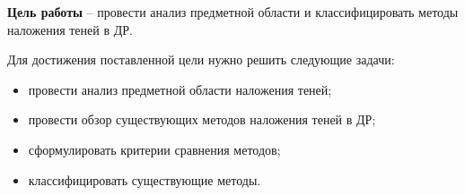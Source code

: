 \textbf{Цель работы} -- провести анализ предметной области и классифицировать методы наложения теней в ДР.

Для достижения поставленной цели нужно решить следующие задачи:

\begin{itemize}
	\item провести анализ предметной области наложения теней;
	\item провести обзор существующих методов наложения теней в ДР;
	\item сформулировать критерии сравнения методов;
	\item классифицировать существующие методы.
\end{itemize}